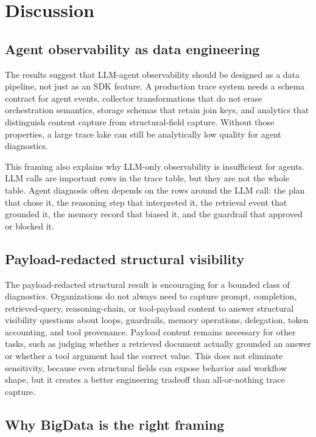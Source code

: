 \documentclass[conference]{IEEEtran}
\begin{document}
\section{Discussion}
\label{sec:discussion}

\subsection{Agent observability as data engineering}

The results suggest that LLM-agent observability should be designed as
a data pipeline, not just as an SDK feature. A production trace system
needs a schema contract for agent events, collector transformations that
do not erase orchestration semantics, storage schemas that retain join
keys, and analytics that distinguish content capture from
structural-field capture. Without those properties, a large trace lake
can still be analytically low quality for agent diagnostics.

This framing also explains why LLM-only observability is insufficient
for agents. LLM calls are important rows in the trace table, but they
are not the whole table. Agent diagnosis often depends on the rows
around the LLM call: the plan that chose it, the reasoning step that
interpreted it, the retrieval event that grounded it, the memory record
that biased it, and the guardrail that approved or blocked it.

\subsection{Payload-redacted structural visibility}

The payload-redacted structural result is encouraging for a bounded
class of diagnostics. Organizations do not always need to capture
prompt, completion, retrieved-query, reasoning-chain, or tool-payload
content to answer structural visibility questions about loops,
guardrails, memory operations, delegation, token accounting, and tool
provenance. Payload content remains necessary for other tasks, such as
judging whether a retrieved document actually grounded an answer or
whether a tool argument had the correct value. This does not eliminate
sensitivity, because even structural fields can expose behavior and
workflow shape, but it creates a better engineering tradeoff than
all-or-nothing trace capture.

\subsection{Why BigData is the right framing}
\end{document}
